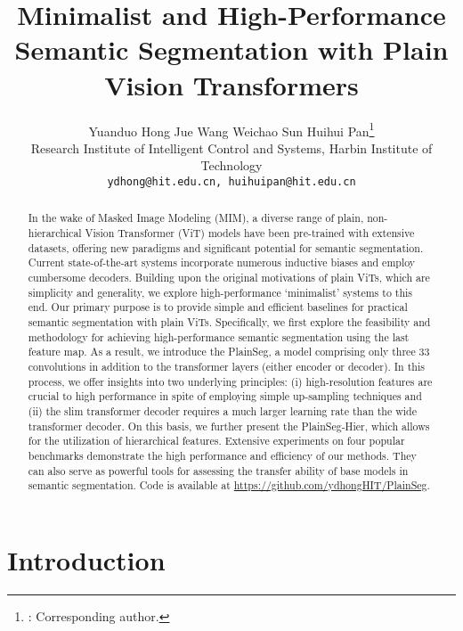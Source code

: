 \documentclass{article} \usepackage{iclr2024_conference,times}
\title{Minimalist and High-Performance Semantic Segmentation with Plain Vision Transformers}
\author{Yuanduo Hong \quad Jue Wang \quad Weichao Sun \quad Huihui Pan\thanks{: Corresponding author.}
\\
Research Institute of Intelligent Control and Systems, Harbin Institute of Technology \\
{\tt\small ydhong@hit.edu.cn, huihuipan@hit.edu.cn}
}
\begin{document}
\maketitle

\begin{abstract}
In the wake of Masked Image Modeling (MIM), a diverse range of plain, non-hierarchical Vision Transformer (ViT) models have been pre-trained with extensive datasets, offering new paradigms and significant potential for semantic segmentation. Current state-of-the-art systems incorporate numerous inductive biases and employ cumbersome decoders. Building upon the original motivations of plain ViTs, which are simplicity and generality, we explore high-performance `minimalist' systems to this end. Our primary purpose is to provide simple and efficient baselines for practical semantic segmentation with plain ViTs. Specifically, we first explore the feasibility and methodology for achieving high-performance semantic segmentation using the last feature map. As a result, we introduce the PlainSeg, a model comprising only three 33 convolutions in addition to the transformer layers (either encoder or decoder). In this process, we offer insights into two underlying principles: (i) high-resolution features are crucial to high performance in spite of employing simple up-sampling techniques and (ii) the slim transformer decoder requires a much larger learning rate than the wide transformer decoder. On this basis, we further present the PlainSeg-Hier, which allows for the utilization of hierarchical features. Extensive experiments on four popular benchmarks demonstrate the high performance and efficiency of our methods. They can also serve as powerful tools for assessing the transfer ability of base models in semantic segmentation. Code is available at \url{https://github.com/ydhongHIT/PlainSeg}.
\end{abstract}

\section{Introduction}
\end{document}
